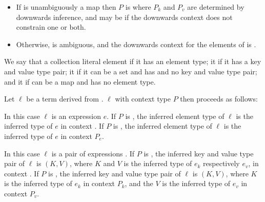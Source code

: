 \documentclass[makeidx]{article}
\begin{document}
{\begin{itemize}
\item
  If  is unambiguously a map
  then $P$ is 
  where $P_k$ and $P_v$ are determined by downwards inference,
  and may be \FreeContext{}
  if the downwards context does not constrain one or both.
\item
  Otherwise,  is ambiguous,
  and the downwards context for the elements of 
  is \FreeContext.
\end{itemize}

\LMHash{}%
We say that a collection literal element
if it has an element type;
it
if it has a key and value type pair;
it
if it can be a set and has and no key and value type pair;
and it
if can be a map and has no element type.

\LMHash{}%
Let $\ell$ be a term derived from .
$\ell$ with context type $P$ then proceeds
as follows:

\LMHash{}%
In this case $\ell$ is an expression $e$.
%
If $P$ is \FreeContext,
the inferred element type of $\ell$ is
the inferred type of $e$ in context \FreeContext.
%
If $P$ is ,
the inferred element type of $\ell$ is
the inferred type of $e$ in context $P_e$.
\EndCase

\LMHash{}%
In this case $\ell$ is a pair of expressions .
%
If $P$ is \FreeContext,
the inferred key and value type pair of $\ell$ is $(K, V)$,
where $K$ and $V$ is
the inferred type of $e_k$ respectively $e_v$,
in context \FreeContext.
%
If $P$ is ,
the inferred key and value type pair of $\ell$ is $(K, V)$,
where $K$ is
the inferred type of $e_k$ in context $P_k$, and
the $V$ is
the inferred type of $e_v$ in context $P_v$.
\EndCase

}
\end{document}
